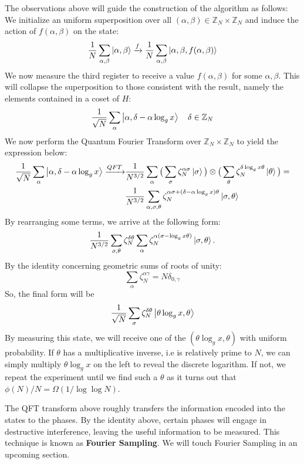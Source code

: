 The observations above will guide the construction of the algorithm as follows: We initialize an uniform superposition over all $(\alpha,\beta) \in \mathbb{Z}_N \times \mathbb{Z}_N $ and induce the action of $f(\alpha, \beta)$ on the state:
%
\begin{gather}
  \frac{1}{N} \sum_{\alpha,\beta} \ket{\alpha, \beta} \xrightarrow{f} \frac{1}{N} \sum_{\alpha,\beta} \ket{\alpha, \beta, f(\alpha, \beta)}
\end{gather}
%
We now measure the third register to receive a value $f(\alpha,\beta)$ for some $\alpha,\beta$. This will collapse the superposition to those consistent with the result, namely the elements contained in a coset of $H$:
%
\begin{equation}
  \frac{1}{\sqrt{N}} \sum_{\alpha} \ket{\alpha,\delta - \alpha\log_g{x}} \quad \delta \in \mathbb{Z}_N
\end{equation}
%
We now perform the Quantum Fourier Transform over $\mathbb{Z}_N \times \mathbb{Z}_N$ to yield the expression below:
%
\begin{gather}
  \begin{split}
    \frac{1}{\sqrt{N}} \sum_{\alpha} \ket{\alpha,\delta - \alpha\log_g{x}} \xrightarrow{QFT}
    & \frac{1}{N^{3/2}} \sum_{\alpha} \big(\sum_{\sigma} \zeta_N^{\alpha\sigma} \ket{\sigma}\big) \otimes \big(\sum_{\theta} \zeta_N^{\delta\log_g{x}\theta} \ket{\theta} \big) = \\
    & \frac{1}{N^{3/2}}\sum_{\alpha,\sigma,\theta} \zeta_N^{\alpha\sigma + (\delta - \alpha\log_g{x})\theta} \ket{\sigma,\theta}
  \end{split}
\end{gather}
By rearranging some terms, we arrive at the following form:
%
\begin{gather}
\frac{1}{N^{3/2}}\sum_{\sigma,\theta} \zeta_N^{\delta\theta} \sum_{\alpha} \zeta_N^{\alpha(\sigma - \log_g{x}\theta)}\ket{\sigma,\theta}.
\end{gather}
%
By the identity concerning geometric sums of roots of unity:
$$ \sum_{\alpha} \zeta_N^{\alpha\gamma} = N \delta_{0,\gamma} $$
So, the final form will be
%
$$ \frac{1}{\sqrt{N}} \sum_{\sigma} \zeta_N^{\delta\theta} \ket{\theta\log_g{x},\theta} $$
By measuring this state, we will receive one of the $(\theta\log_g{x}, \theta)$ with uniform probability. If $\theta$ has a multiplicative inverse, i.e is relatively prime to $N$, we can simply multiply $\theta\log_g{x}$ on the left to reveal the discrete logarithm. If not, we repeat the experiment until we find such a $\theta$ as it turns out that $\phi(N) / N = \Omega(1/\log\log{N})$.
%
\begin{remark}
  The QFT transform above roughly transfers the information encoded into the states to the phases. By the identity above, certain phases will engage in destructive interference, leaving the useful information to be measured. This technique is known as {\bf Fourier Sampling}. We will touch Fourier Sampling in an upcoming section.
\end{remark}

